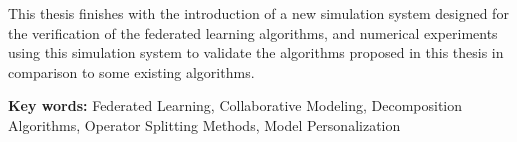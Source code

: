This thesis finishes with the introduction of a new simulation system designed for the verification of the federated learning algorithms, and numerical experiments using this simulation system to validate the algorithms proposed in this thesis in comparison to some existing algorithms.

\par
\bigskip

{\bf Key words:} Federated Learning, Collaborative Modeling, Decomposition Algorithms, Operator Splitting Methods, Model Personalization


